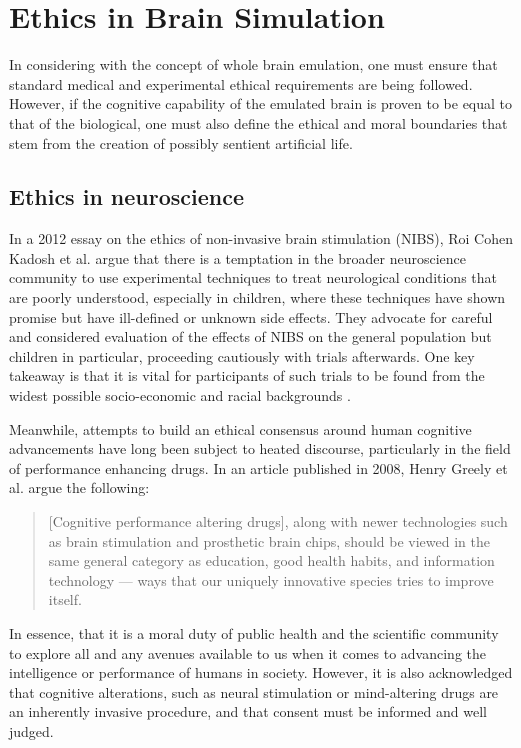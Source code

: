 \section{Ethics in Brain Simulation}

In considering with the concept of whole brain emulation, one must ensure that
standard medical and experimental ethical requirements are being followed.
However, if the cognitive capability of the emulated brain is proven to be equal
to that of the biological, one must also define the ethical and moral boundaries
that stem from the creation of possibly sentient artificial life. 

\subsection{Ethics in neuroscience}

In a 2012 essay on the ethics of non-invasive brain stimulation (NIBS), Roi
Cohen Kadosh et al. argue that there is a temptation in the broader neuroscience
community to use experimental techniques to treat neurological conditions that
are poorly understood, especially in children, where these techniques have shown
promise but have ill-defined or unknown side effects. They advocate for careful
and considered evaluation of the effects of NIBS on the general population but
children in particular, proceeding cautiously with trials afterwards. One key
takeaway is that it is vital for participants of such trials to be found from
the widest possible socio-economic and racial backgrounds
\autocite{kadosh_neuroethics_2012}. 

Meanwhile, attempts to build an ethical consensus around human cognitive
advancements have long been subject to heated discourse, particularly in the
field of performance enhancing drugs. In an article published in 2008, Henry
Greely et al. argue the following:

\begin{quote}
    [Cognitive performance altering drugs], along with newer technologies such
    as brain stimulation and prosthetic brain chips, should be viewed in the
    same general category as education, good health habits, and information
    technology — ways that our uniquely innovative species tries to improve
    itself.
    \begin{flushright}
        \textit{\autocite{greely_towards_2008}}
    \end{flushright}
\end{quote}

In essence, that it is a moral duty of public health and the scientific
community to explore all and any avenues available to us when it comes to
advancing the intelligence or performance of humans in society. However, it is
also acknowledged that cognitive alterations, such as neural stimulation or
mind-altering drugs are an inherently invasive procedure, and that consent must
be informed and well judged. 

